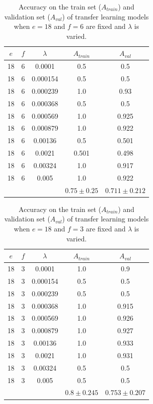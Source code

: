 \begin{table}[ht]
\centering
\begin{tabular}{ |c|c|c|c|c| }
\hline
$e$ & $f$ & $\lambda$ & $A_{train}$ & $A_{val}$ \\
\hline
18 & 6 & 0.0001 & 0.5 & 0.5 \\
18 & 6 & 0.000154 & 0.5 & 0.5 \\
18 & 6 & 0.000239 & 1.0 & 0.93 \\
18 & 6 & 0.000368 & 0.5 & 0.5 \\
18 & 6 & 0.000569 & 1.0 & 0.925 \\
18 & 6 & 0.000879 & 1.0 & 0.922 \\
18 & 6 & 0.00136 & 0.5 & 0.501 \\
18 & 6 & 0.0021 & 0.501 & 0.498 \\
18 & 6 & 0.00324 & 1.0 & 0.917 \\
18 & 6 & 0.005 & 1.0 & 0.922 \\
\hline
 & & & $0.75\pm0.25$ & $0.711\pm0.212$ \\
\hline
\end{tabular}
\caption{Accuracy on the train set ($A_{train}$) and validation set ($A_{val}$) of transfer learning models when $e = 18$ and $f = 6$ are fixed and $\lambda$ is varied.}
\label{table:vgg16_finetuning_6}
\end{table}

\begin{table}[ht]
\centering
\begin{tabular}{ |c|c|c|c|c| }
\hline
$e$ & $f$ & $\lambda$ & $A_{train}$ & $A_{val}$ \\
\hline
18 & 3 & 0.0001 & 1.0 & 0.9 \\
18 & 3 & 0.000154 & 0.5 & 0.5 \\
18 & 3 & 0.000239 & 0.5 & 0.5 \\
18 & 3 & 0.000368 & 1.0 & 0.915 \\
18 & 3 & 0.000569 & 1.0 & 0.926 \\
18 & 3 & 0.000879 & 1.0 & 0.927 \\
18 & 3 & 0.00136 & 1.0 & 0.933 \\
18 & 3 & 0.0021 & 1.0 & 0.931 \\
18 & 3 & 0.00324 & 0.5 & 0.5 \\
18 & 3 & 0.005 & 0.5 & 0.5 \\
\hline
 & & & $0.8\pm0.245$ & $0.753\pm0.207$ \\
\hline
\end{tabular}
\caption{Accuracy on the train set ($A_{train}$) and validation set ($A_{val}$) of transfer learning models when $e = 18$ and $f = 3$ are fixed and $\lambda$ is varied.}
\label{table:vgg16_finetuning_3}
\end{table}

